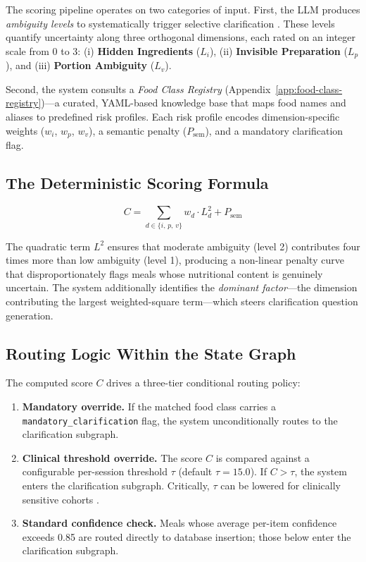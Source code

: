The scoring pipeline operates on two categories of input. First, the LLM produces \emph{ambiguity levels} to systematically trigger selective clarification \citep{kuhnCLAMSelectiveClarification2023}. These levels quantify uncertainty along three orthogonal dimensions, each rated on an integer scale from 0 to 3: (i) \textbf{Hidden Ingredients} ($L_i$), (ii) \textbf{Invisible Preparation} ($L_p$), and (iii) \textbf{Portion Ambiguity} ($L_v$).

Second, the system consults a \emph{Food Class Registry} (Appendix~\ref{app:food-class-registry})---a curated, YAML-based knowledge base that maps food names and aliases to predefined risk profiles. Each risk profile encodes dimension-specific weights ($w_i$, $w_p$, $w_v$), a semantic penalty ($P_{\text{sem}}$), and a mandatory clarification flag.

\subsection{The Deterministic Scoring Formula}

\[
    C = \sum_{d \in \{i,\, p,\, v\}} w_d \cdot L_d^{2} + P_{\text{sem}}
\]

The quadratic term $L^2$ ensures that moderate ambiguity (level 2) contributes four times more than low ambiguity (level 1), producing a non-linear penalty curve that disproportionately flags meals whose nutritional content is genuinely uncertain. The system additionally identifies the \emph{dominant factor}---the dimension contributing the largest weighted-square term---which steers clarification question generation.

\subsection{Routing Logic Within the State Graph}

The computed score $C$ drives a three-tier conditional routing policy:

\begin{enumerate}
    \item \textbf{Mandatory override.} If the matched food class carries a \texttt{mandatory\_clarification} flag, the system unconditionally routes to the clarification subgraph.

    \item \textbf{Clinical threshold override.} The score $C$ is compared against a configurable per-session threshold $\tau$ (default $\tau = 15.0$). If $C > \tau$, the system enters the clarification subgraph. Critically, $\tau$ can be lowered for clinically sensitive cohorts \citep{evertNutritionTherapyAdults2019}.

    \item \textbf{Standard confidence check.} Meals whose average per-item confidence exceeds 0.85 are routed directly to database insertion; those below enter the clarification subgraph.
\end{enumerate}

